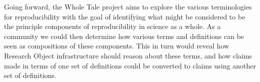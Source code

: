 Going forward, the Whole Tale project aims to explore the various terminologies for reproducibility with the goal of identifying 
	what might be considered to be the principle components of reproducibility in science as a whole.
As a community we could then determine how various terms and definitions can be seen as compositions of these components.
This in turn would reveal how Research Object infrastructure should reason about these terms, and  how claims 
	made in terms of one set of definitions could be converted to claims using another set of definitions.




